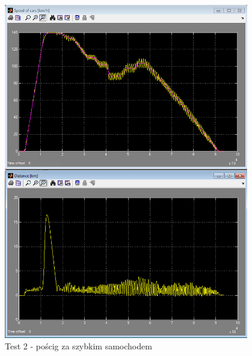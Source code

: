 \documentclass[11pt,a4paper]{article}
\begin{document}
\begin{figure}
\centering
\includegraphics[width=0.95\textwidth]{highSpeedChase.png}
\caption{Test 2 - pościg za szybkim samochodem} 
\label{img:test2}
\end{figure}
\end{document}
